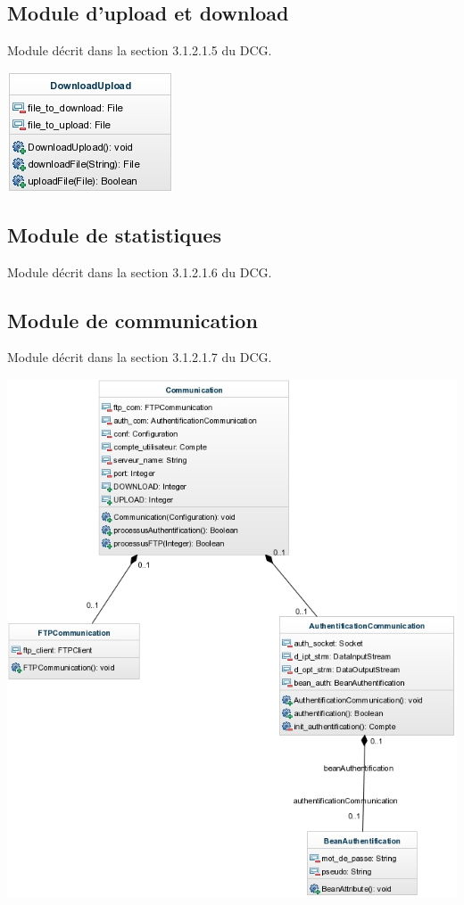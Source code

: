 \documentclass[10pt,a4paper]{report}
\begin{document}
\subsection{Module d'upload et download}
Module décrit dans la section 3.1.2.1.5 du DCG.
\begin{center}
	\includegraphics{./Ressources/downlaodUpload.jpeg}\\
\end{center}

\subsection{Module de statistiques}
Module décrit dans la section 3.1.2.1.6 du DCG.
\begin{center}
\end{center}

\subsection{Module de communication}
Module décrit dans la section 3.1.2.1.7 du DCG.
\begin{center}
	\includegraphics{./Ressources/communication.jpeg}\\
\end{center}
\end{document}
